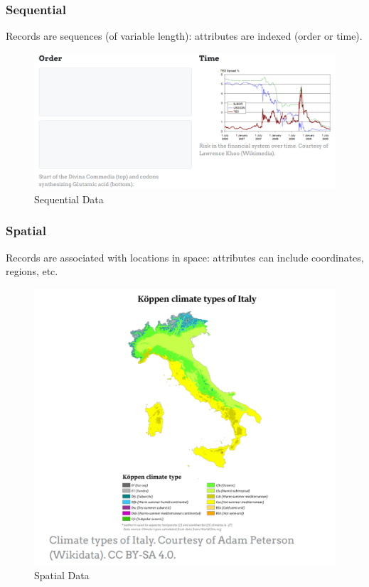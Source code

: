 \newpage
\subsubsection{Sequential}
\begin{paracol}{2}
   Records are sequences (of variable length): attributes are indexed (order or time).
   

   \switchcolumn
   
   \begin{figure}[htbp]
      \centering
      \includegraphics{images/01/sequential.png}
      \caption{Sequential Data}

      \label{fig:01/sequential}
   \end{figure}
\end{paracol}

\subsubsection{Spatial}
\begin{paracol}{2}
   

   Records are associated with locations in space: attributes can include coordinates, regions, etc.
   \switchcolumn
   
   \begin{figure}[htbp]
      \centering
      \includegraphics{images/01/spatial.png}
      \caption{Spatial Data}
      \label{fig:01/spatial}
   \end{figure}
\end{paracol}

